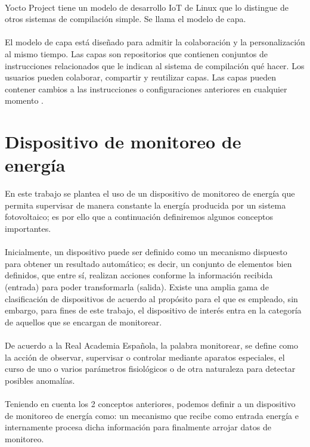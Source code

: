 \paragraph{}
Yocto Project tiene un modelo de desarrollo IoT de Linux que lo distingue de otros sistemas de compilación simple. Se llama el modelo de capa.
\paragraph{}
El modelo de capa está diseñado para admitir la colaboración y la personalización al mismo tiempo. Las capas son repositorios que contienen conjuntos de instrucciones relacionados que le indican al sistema de compilación qué hacer. Los usuarios pueden colaborar, compartir y reutilizar capas. Las capas pueden contener cambios a las instrucciones o configuraciones anteriores en cualquier momento \citep{MarcoTeoricoYocto2}.


\section{Dispositivo de monitoreo de energía}
En este trabajo se plantea el uso de un dispositivo de monitoreo de energía que permita supervisar de manera constante la energía producida por un sistema fotovoltaico; es por ello que a continuación definiremos algunos conceptos importantes.
\paragraph{}
Inicialmente, un dispositivo puede ser definido como un mecanismo dispuesto para obtener un resultado automático\citep{MarcoTeorico11}; es decir, un conjunto de elementos bien definidos, que entre sí, realizan acciones conforme la información recibida (entrada) para poder transformarla (salida).
Existe una amplia gama de clasificación de dispositivos de acuerdo al propósito para el que es empleado, sin embargo, para fines de este trabajo, el dispositivo de interés entra en la categoría de aquellos que se encargan de monitorear. 
\paragraph{}
De acuerdo a la Real Academia Española, la palabra monitorear, se define como la acción de observar, supervisar o controlar mediante aparatos especiales, el curso de uno o varios parámetros fisiológicos o de otra naturaleza para detectar posibles anomalías.\citep{MarcoTeorico12}
\paragraph{}
Teniendo en cuenta los 2 conceptos anteriores, podemos definir a un dispositivo de monitoreo de energía como: un mecanismo que recibe como entrada energía e internamente procesa dicha información para finalmente arrojar datos de monitoreo.
